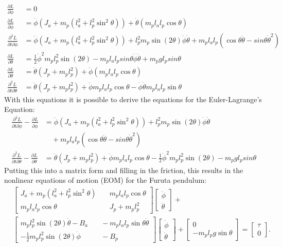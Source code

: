 \begin{align*}
	\frac{\partial L}{\partial \phi}&=0\\
	\frac{\partial L}{\partial 
	\dot{\phi}}&=\dot{\phi}(J_a+m_p(l_a^2+l_p^2\sin^2\theta))+\dot{\theta}(
	m_pl_al_p\cos\theta)\\
	\frac{\partial^2 L}{\partial t \partial \dot{\phi}}&= 
	\ddot{\phi}(J_a+m_p(l_a^2+l_p^2\sin^2 \theta))+l_p^2m_p\sin(2\theta)
	\dot{\phi}\dot{\theta}+m_pl_al_p(\cos 
	\theta\ddot{\theta}-sin\theta \dot{\theta}^2)\\
	\frac{\partial L}{\partial 
	\theta}&=\frac{1}{2}\dot{\phi}^2m_pl_p^2\sin(2\theta)-m_pl_al_psin\theta\dot{\phi}
	\dot{\theta}+m_pgl_psin\theta\\
	\frac{\partial L}{\partial 
		\dot{\theta}}&=\dot{\theta}(J_p+m_pl_p^2)+\dot{\phi}(m_pl_al_p\cos\theta)\\
	\frac{\partial^2 L}{\partial t \partial 
	\dot{\theta}}&=\ddot{\theta}(J_p+m_pl_p^2)+\ddot{\phi}m_pl_al_p\cos\theta-\dot{\phi}
	\dot{\theta}m_pl_al_p\sin\theta
\end{align*}
With this equations it is possible to derive the equations for the 
Euler-Lagrange's Equation:
\begin{align*}
\frac{\partial^2 L}{\partial t\partial\dot{\phi}}-\frac{\partial 
L}{\partial\dot{\phi}}&=\ddot{\phi}(J_a+m_p(l_a^2+l_p^2\sin^2 
\theta))+l_p^2m_p\sin(2\theta)
\dot{\phi}\dot{\theta}\\ &\quad + m_pl_al_p(\cos 
\theta\ddot{\theta}-sin\theta \dot{\theta}^2)\\
\frac{\partial^2 L}{\partial t\partial\dot{\theta}}-\frac{\partial 
L}{\partial\dot{\theta}}&=\ddot{\theta}(J_p+m_pl_p^2)+\ddot{\phi}m_pl_al_p\cos\theta-\frac{1}{2}\dot{\phi}^2m_pl_p^2\sin(2\theta)-m_pgl_psin\theta
\end{align*}
Putting this into a matrix form and filling in the friction, this results in 
the nonlinear equations of motion (EOM) for the Furuta pendulum:
\begin{align*}
&\begin{bmatrix}
J_a+m_p(l_a^2+l_p^2\sin^2\theta)& \quad m_pl_al_p\cos\theta \\ 
m_pl_al_p\cos\theta& \quad J_p+m_pl_p^2 
\end{bmatrix} 
\begin{bmatrix}
\ddot{\phi}\\
\ddot{\theta}
\end{bmatrix} + \\
&\begin{bmatrix}
m_pl_p^2\sin(2\theta)\dot{\theta}- B_a& \quad -m_pl_al_p\sin \theta 
\dot{\theta}\\
-\frac{1}{2}m_pl_p^2\sin(2\theta)\dot{\phi} &\quad -B_p
\end{bmatrix}
\begin{bmatrix}
\dot{\phi}\\
\dot{\theta}
\end{bmatrix} +
\begin{bmatrix}
0\\
-m_pl_pg\sin\theta
\end{bmatrix}=\begin{bmatrix}
\tau \\
0
\end{bmatrix}.
\end{align*}

